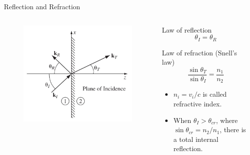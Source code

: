 \documentclass{beamer}
\begin{document}
\begin{frame}{Reflection and Refraction}
    \begin{columns}
        \begin{column}{.3\linewidth}
            \begin{figure}[htbp]
                \centering
                \includegraphics[width=\textwidth]{Images/re.jpg}
            \end{figure}
        \end{column}
        \begin{column}{.7\linewidth}
            \begin{block}{Law of reflection}
                \begin{equation}
                    \theta_I = \theta_R
                \end{equation}
            \end{block}

            \begin{block}{Law of refraction (Snell's law)}
                \begin{equation}
                    \frac{\sin \theta_T}{\sin \theta_I} = \frac{n_1}{n_2}
                \end{equation}
            \end{block}
            \begin{itemize}
                \item $n_i = v_i / c$ is called refractive index.
                \item When $\theta_I > \theta_{cr}$, where $\sin \theta_{cr} = n_2 / n_1$, there is a total internal reflection.
            \end{itemize}
        \end{column}
    \end{columns}
\end{frame}
\end{document}
